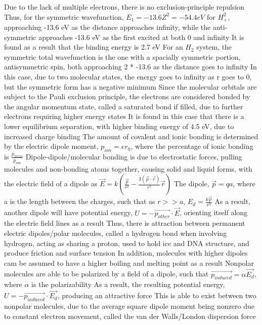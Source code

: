 \documentclass[11 pt, twoside]{article}
\newenvironment{outline*}
{
	\begin{outline}[enumerate]
	}
	{\end{outline}
}
\begin{document}
\begin{outline*}
		\3 Due to the lack of multiple electrons, there is no exclusion-principle repulsion
		\3 Thus, for the symmetric wavefunction, $E_1 = -13.6 Z^2 = -54.4 eV$ for $H^2_+$, approaching -13.6 eV as the distance approaches infinity, while the anti-symmetric approaches -13.6 eV as the first excited at both 0 and infinity
		\3 It is found as a result that the binding energy is 2.7 eV
	\2 For an $H_2$ system, the symmetric total wavefunction is the one with a spacially symmetric portion, antisymmetric spin, both approaching 2 * -13.6 as the distance goes to infinity
		\3 In this case, due to two molecular states, the energy goes to infinity as r goes to 0, but the symmetric form has a negative minimum
		\3 Since the molecular orbitals are subject to the Pauli exclusion principle, the electrons are considered bonded by the angular momentum state, called a saturated bond if filled, due to further electrons requiring higher energy states
		\3 It is found in this case that there is a lower equilibrium separation, with higher binding energy of 4.5 eV, due to increased charge binding
	\2 The amount of covalent and ionic bonding is determined by the electric dipole moment, $p_{ion} = er_0$, where the percentage of ionic bonding is $\frac{p_{meas}}{p_{ion}}$
\1 Dipole-dipole/molecular bonding is due to electrostatic forces, pulling molecules and non-bonding atoms together, causing solid and liquid forms, with the electric field of a dipole as $\vec{E} = k(\frac{\vec{p}}{r^3} - \frac{3(\vec{p} \cdot \vec{r})}{r^5}\vec{r})$
	\2 The dipole, $\vec{p} = qa$, where a is the length between the charges, such that as $r >> a$, $E_d = \frac{k\vec{p}}{r^3}$
	\2 As a result, another dipole will have potential energy, $U = -\vec{p_{other}} \cdot \vec{E}$, orienting itself along the electric field lines as a result
		\3 Thus, there is attraction between permanent electric dipoles/polar molecules, called a hydrogen bond when involving hydrogen, acting as sharing a proton, used to hold ice and DNA structure, and produce friction and surface tension
		\3 In addition, molecules with higher dipoles cam be assumed to have a higher boiling and melting point as a result
	\2 Nonpolar molecules are able to be polarized by a field of a dipole, such that $\vec{p_{induced}} = \alpha \vec{E_d}$, where $\alpha$ is the polarizability
		\3 As a result, the resulting potential energy, $U = -\vec{p_{induced}} \cdot \vec{E_d}$, producing an attractive force
		\3 This is able to exist between two nonpolar molecules, due to the average square dipole moment being nonzero due to constant electron movement, called the van der Walls/London dispersion force

\end{outline*}
\end{document}
